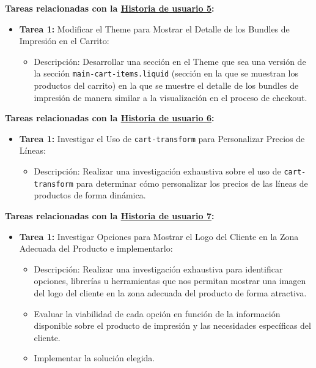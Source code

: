 \documentclass[12pt]{article}
\begin{document}
\textbf{Tareas relacionadas con la \hyperref[sec:historia5]{Historia de usuario 5}:}
\begin{itemize}
    \item \textbf{Tarea 1:} Modificar el Theme para Mostrar el Detalle de los Bundles de Impresión en el Carrito:
          \begin{itemize}[label=--]
              \item Descripción: Desarrollar una sección en el Theme que sea una versión de la sección \texttt{main-cart-items.liquid} (sección en la que se muestran los productos del carrito) en la que se muestre el detalle de los bundles de impresión de manera similar a la visualización en el proceso de checkout.
          \end{itemize}
\end{itemize}

\textbf{Tareas relacionadas con la \hyperref[sec:historia6]{Historia de usuario 6}:}
\begin{itemize}
    \item \textbf{Tarea 1:} Investigar el Uso de \texttt{cart-transform} para Personalizar Precios de Líneas:
          \begin{itemize}[label=--]
              \item Descripción: Realizar una investigación exhaustiva sobre el uso de \texttt{cart-transform} para determinar cómo personalizar los precios de las líneas de productos de forma dinámica.
          \end{itemize}
\end{itemize}

\textbf{Tareas relacionadas con la \hyperref[sec:historia7]{Historia de usuario 7}:}
\begin{itemize}
    \item \textbf{Tarea 1:} Investigar Opciones para Mostrar el Logo del Cliente en la Zona Adecuada del Producto e implementarlo:
          \begin{itemize}[label=--]
              \item Descripción: Realizar una investigación exhaustiva para identificar opciones, librerías u herramientas que nos permitan mostrar una imagen del logo del cliente en la zona adecuada del producto de forma atractiva.
              \item Evaluar la viabilidad de cada opción en función de la información disponible sobre el producto de impresión y las necesidades específicas del cliente.
              \item Implementar la solución elegida.
          \end{itemize}
\end{itemize}
\end{document}
